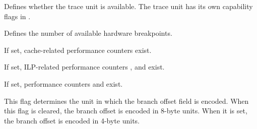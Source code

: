 \reset{***}
Defines whether the trace unit is available. The trace unit has its own
capability flags in .

\implementation{}

\reset{***}
Defines the number of available hardware breakpoints.

\implementation{}

\reset{*}
If set, cache-related performance counters exist.

\implementation{}

\reset{*}
If set, ILP-related performance counters ,  and  exist.

\implementation{}

\reset{*}
If set, performance counters  and  exist.

\implementation{}

\reset{*}
This flag determines the unit in which the branch offset field is encoded. When
this flag is cleared, the branch offset is encoded in 8-byte units. When it is
set, the branch offset is encoded in 4-byte units.


